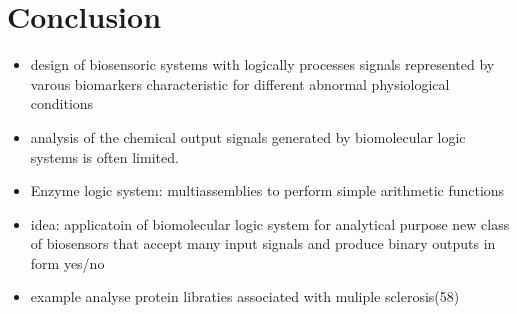 \documentclass[runningheads]{llncs}
\begin{document}
\section{Conclusion}

\begin{itemize}
	\item design of biosensoric systems with logically processes signals represented by varous biomarkers characteristic for different abnormal physiological conditions
	\item analysis of the chemical output signals generated by biomolecular logic systems is often limited.
	\item Enzyme logic system: multiassemblies to perform simple arithmetic functions
	\item idea: applicatoin of biomolecular logic system for analytical purpose new class of biosensors that accept many input signals and produce binary outputs in form yes/no 
	\item example analyse protein libraties associated with muliple sclerosis(58)
\end{itemize}
\end{document}
